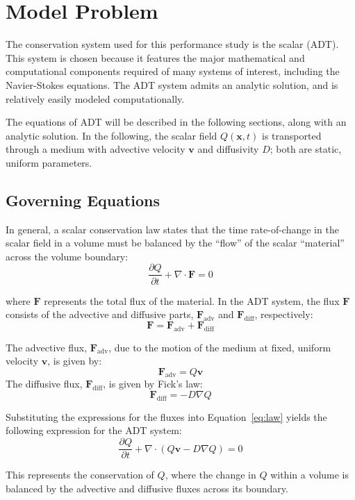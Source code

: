 \documentclass[11pt]{article}
\renewcommand{\vec}[1]{\bm{#1}}
\begin{document}
\section{Model Problem}

The conservation system used for this performance study is the scalar (ADT).   This system is chosen because it features the major mathematical and computational components required of many systems of interest, including the Navier-Stokes equations. The ADT system admits an analytic solution, and is relatively easily modeled computationally.

The equations of ADT will be described in the following sections, along with an analytic solution. In the following, the scalar field $Q(\vec{x}, t)$ is transported through a medium with advective velocity $\vec{v}$ and diffusivity $D$; both are static, uniform parameters.

\subsection{Governing Equations}
In general, a scalar conservation law states that the time rate-of-change in the scalar field in a volume must be balanced by the ``flow'' of the scalar ``material'' across the volume boundary:   
\begin{equation}
  \frac{\partial Q}{\partial t} + \nabla \cdot \vec{F} = 0
  \label{eq:law}
\end{equation}

where $\vec{F}$ represents the total flux of the material. In the ADT system, the flux $\vec{F}$  consists of the advective and diffusive parts, $\vec{F}_{\text{adv}}$ and $\vec{F}_{\text{diff}}$, respectively:
\[
\vec{F} = \vec{F}_{\text{adv}} + \vec{F}_{\text{diff}}
\]

The advective flux, $\vec{F}_{\text{adv}}$, due to the motion of the medium at fixed, uniform velocity $\vec{v}$, is given by:
\[
\vec{F}_{\text{adv}} = Q\vec{v}
\]
The diffusive flux, $\vec{F}_{\text{diff}}$, is given by Fick's law:
\[
\vec{F}_{\text{diff}} = -D \nabla Q
\]

Substituting the expressions for the fluxes into Equation~\ref{eq:law} yields the following expression for the ADT system:
\begin{equation}
  \frac{\partial Q}{\partial t} + \nabla \cdot (Q\vec{v} - D \nabla Q) = 0
  \label{eq:adt}
\end{equation}

This represents the conservation of $Q$, where the change in $Q$ within a volume is balanced by the advective and diffusive fluxes across its boundary.
\end{document}
